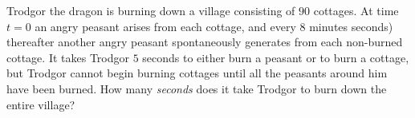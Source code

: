 Trodgor the dragon is burning down a village consisting of $ 90$ cottages.  At time $ t = 0$ an angry peasant arises from each cottage, and every $ 8$ minutes  seconds) thereafter another angry peasant spontaneously generates from each non-burned cottage.  It takes Trodgor $ 5$ seconds to either burn a peasant or to burn a cottage, but Trodgor cannot begin burning cottages until all the peasants around him have been burned. How many \textit{seconds} does it take Trodgor to burn down the entire village?